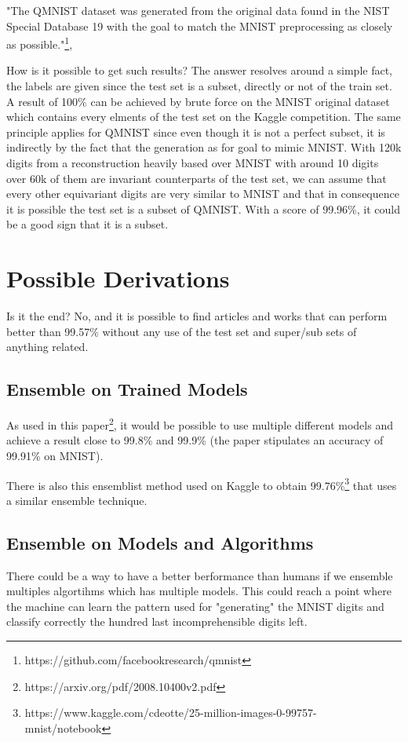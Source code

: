 \documentclass{article}
\begin{document}
"The QMNIST dataset was generated from the original data found in the NIST 
Special Database 19 with the goal to match the MNIST preprocessing as closely as
possible."\footnote{https://github.com/facebookresearch/qmnist},


How is it possible to get such results? The answer resolves around a simple
fact, the labels are given since the test set is a subset, directly or not of
the train set. A result of 100\% can be achieved by brute force on the MNIST
original dataset which contains every elments of the test set on the Kaggle
competition. The same principle applies for QMNIST since even though it is not
a perfect subset, it is indirectly by the fact that the generation as for goal
to mimic MNIST. With 120k digits from a reconstruction heavily based over MNIST
with around 10 digits over 60k of them are invariant counterparts of the test
set, we can assume that every other equivariant digits are very similar to MNIST
and that in consequence it is possible the test set is a subset of QMNIST. With
a score of 99.96\%, it could be a good sign that it is a subset.


\section{Possible Derivations}
Is it the end? No, and it is possible to find articles and works that can
perform better than 99.57\% without any use of the test set and super/sub sets
of anything related.

\subsection{Ensemble on Trained Models}
As used in this paper\footnote{https://arxiv.org/pdf/2008.10400v2.pdf}, it would
be possible to use multiple different models and achieve a result close to
99.8\% and 99.9\% (the paper stipulates an accuracy of 99.91\% on MNIST).

There is also this ensemblist method used on Kaggle to obtain 99.76\%\footnote{
  https://www.kaggle.com/cdeotte/25-million-images-0-99757-mnist/notebook}
that uses a similar ensemble technique.

\subsection{Ensemble on Models and Algorithms}
There could be a way to have a better berformance than humans if we ensemble
multiples algortihms which has multiple models. This could reach a point where
the machine can learn the pattern used for "generating" the MNIST digits and
classify correctly the hundred last incomprehensible digits left.
\end{document}
